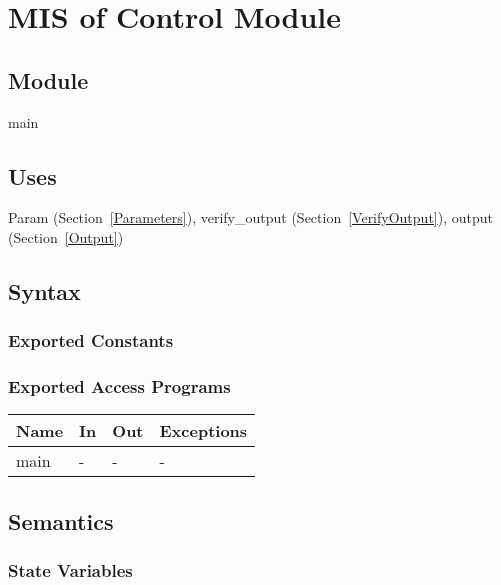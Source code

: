 \documentclass[12pt, titlepage]{article}
\begin{document}
\newpage

\section{MIS of Control Module} \label{Main}

\subsection{Module}

main

\subsection{Uses}

Param (Section~\ref{Parameters}), verify\_output (Section~\ref{VerifyOutput}), 
output (Section~\ref{Output})

\subsection{Syntax}

\subsubsection{Exported Constants}



\subsubsection{Exported Access Programs}

\begin{center}
\begin{tabular}{p{2cm} p{4cm} p{4cm} p{2cm}}
\hline
\textbf{Name} & \textbf{In} & \textbf{Out} & \textbf{Exceptions} \\
\hline
main & - & - & - \\
\hline
\end{tabular}
\end{center}

\subsection{Semantics}

\subsubsection{State Variables}
\end{document}
